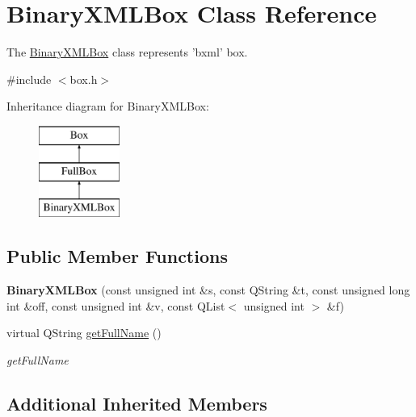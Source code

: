 \hypertarget{class_binary_x_m_l_box}{\section{Binary\-X\-M\-L\-Box Class Reference}
\label{class_binary_x_m_l_box}
}


The \hyperlink{class_binary_x_m_l_box}{Binary\-X\-M\-L\-Box} class represents 'bxml' box.  




{\ttfamily \#include $<$box.\-h$>$}

Inheritance diagram for Binary\-X\-M\-L\-Box\-:\begin{figure}[H]
\begin{center}
\leavevmode
\includegraphics[height=3.000000cm]{class_binary_x_m_l_box}
\end{center}
\end{figure}
\subsection*{Public Member Functions}
\begin{DoxyCompactItemize}
\item 
\hypertarget{class_binary_x_m_l_box_a96b4bac7ee163fde24896a7f595f4e21}{{\bfseries Binary\-X\-M\-L\-Box} (const unsigned int \&s, const Q\-String \&t, const unsigned long int \&off, const unsigned int \&v, const Q\-List$<$ unsigned int $>$ \&f)}\label{class_binary_x_m_l_box_a96b4bac7ee163fde24896a7f595f4e21}

\item 
virtual Q\-String \hyperlink{class_binary_x_m_l_box_a03f9dd3cec50f79bde9f6e861826badd}{get\-Full\-Name} ()
\begin{DoxyCompactList}\small\item\em get\-Full\-Name \end{DoxyCompactList}\end{DoxyCompactItemize}
\subsection*{Additional Inherited Members}


